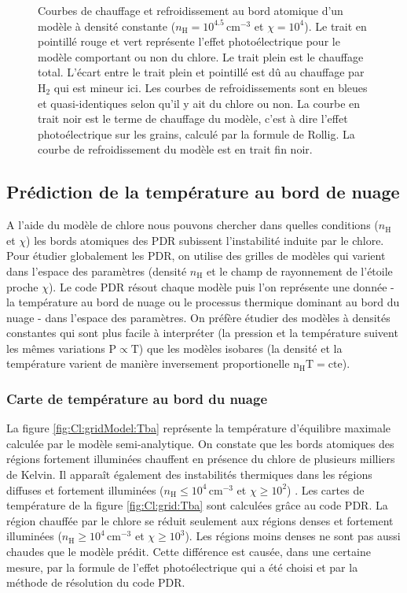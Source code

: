 \begin{figure}[!h]
    \caption{Courbes de chauffage et refroidissement au bord atomique d'un modèle à densité constante ($n_\mathrm{H} = 10^{4.5} \,\mathrm{cm}^{-3}$ et $\chi = 10^4$). Le trait en pointillé rouge et vert représente l'effet photoélectrique pour le modèle comportant ou non du chlore.  Le trait plein est le chauffage total. L'écart entre le trait plein et pointillé est dû au chauffage par $\mathrm{H}_2$ qui est mineur ici. Les courbes de refroidissements sont en bleues et quasi-identiques selon qu'il y ait du chlore ou non. La courbe en trait noir est le terme de chauffage du modèle, c'est à dire l'effet photoélectrique sur les grains, calculé par la formule de Rollig. La courbe de refroidissement du modèle est en trait fin noir.}
    
\end{figure}

\subsection{Prédiction de la température au bord de nuage}
 
A l'aide du modèle de chlore nous pouvons chercher dans quelles conditions ($n_\mathrm{H}$ et $\chi$) les bords atomiques des PDR subissent l'instabilité induite par le chlore. Pour étudier globalement les PDR, on utilise des grilles de modèles qui varient dans l'espace des paramètres (densité $n_\mathrm{H}$ et le champ de rayonnement de l'étoile proche $\chi$). Le code PDR résout chaque modèle puis l'on représente une donnée - la température au bord de nuage ou le processus thermique dominant au bord du nuage - dans l'espace des paramètres. On préfère étudier des modèles à densités constantes qui sont plus facile à interpréter (la pression et la température suivent les mêmes variations $\mathrm{P}\propto \mathrm{T}$) que les modèles isobares (la densité et la température varient de manière inversement proportionelle $\mathrm{n}_\mathrm{H}\mathrm{T}=\mathrm{cte}$). 


\subsubsection{Carte de température au bord du nuage}

La figure \ref{fig:Cl:gridModel:Tba} représente la température d'équilibre maximale calculée par le modèle semi-analytique. On constate que les bords atomiques des régions fortement illuminées chauffent en présence du chlore de plusieurs milliers de Kelvin. 
Il apparaît également des instabilités thermiques dans les régions diffuses et fortement illuminées ($n_\mathrm{H} \leq 10^4 \, \mathrm{cm}^{-3}$ et $\chi \geq 10^2$) . Les cartes de température de la figure \ref{fig:Cl:grid:Tba} sont calculées grâce au code PDR. La région chauffée par le chlore se réduit seulement aux régions denses et fortement illuminées ($n_\mathrm{H} \geq 10^4 \, \mathrm{cm}^{-3}$ et $\chi \geq 10^3$). Les régions moins denses ne sont pas aussi chaudes que le modèle prédit. Cette différence est causée, dans une certaine mesure, par la formule de l'effet photoélectrique qui a été choisi et par la méthode de résolution du code PDR.  \newline 


